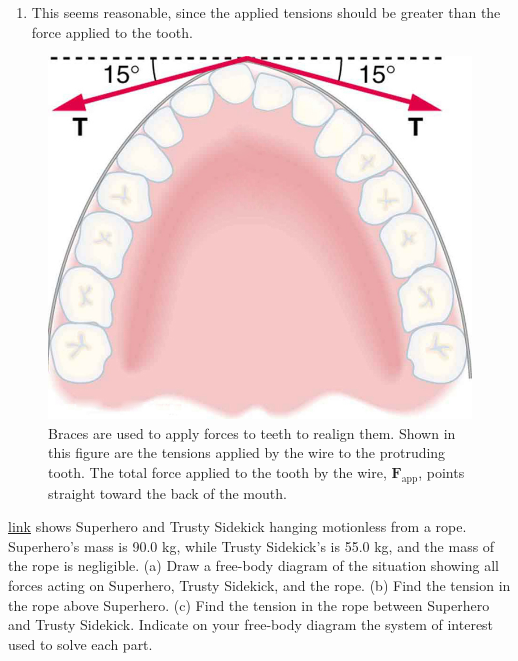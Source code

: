 \documentclass[
]{book}
\newenvironment{problems-exercises}{}{}
\begin{document}
\begin{problems-exercises}
\begin{enumerate}
  The \emph{x}-components of the tension cancel. \({{\sum F_{x}} = 0}{}\).
\item
  This seems reasonable, since the applied tensions should be greater
  than the force applied to the tooth.
\end{enumerate}

\begin{figure}
\hypertarget{import-auto-id1569692}{%
\centering
\includegraphics{images/Figure_04_06_07.jpg}
\caption{Braces are used to apply forces to teeth to realign them. Shown in
this figure are the tensions applied by the wire to the protruding
tooth. The total force applied to the tooth by the wire,
\(\textbf{F}_{\text{app}}{}\), points straight toward the back of the
mouth.}\label{import-auto-id1569692}
}
\end{figure}

\hypertarget{fs-id2686437}{}
\leavevmode\hypertarget{fs-id1295719}{}%
\protect\hyperlink{import-auto-id1655793}{link} shows Superhero
and Trusty Sidekick hanging motionless from a rope. Superhero's mass is
90.0 kg, while Trusty Sidekick's is 55.0 kg, and the mass of the rope is
negligible. (a) Draw a free-body diagram of the situation showing all
forces acting on Superhero, Trusty Sidekick, and the rope. (b) Find the
tension in the rope above Superhero. (c) Find the tension in the rope
between Superhero and Trusty Sidekick. Indicate on your free-body
diagram the system of interest used to solve each part.


\end{problems-exercises}
\end{document}
